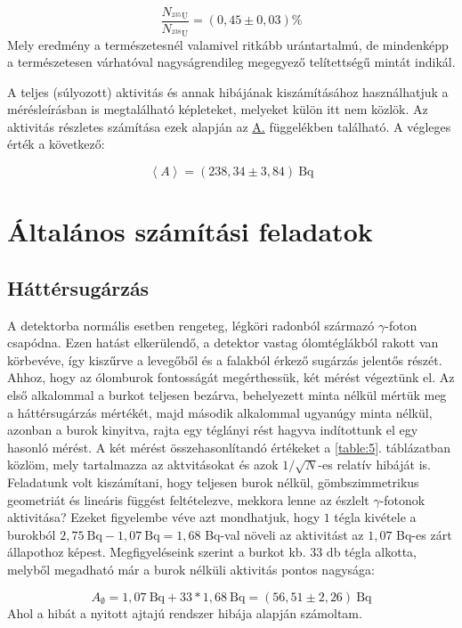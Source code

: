 \begin{multicols}{2}
\begin{equation}
\frac{N_{^{235}\text{U}}}{N_{^{238}\text{U}}}
=
\left( 0,45 \pm 0,03 \right) \%
\end{equation}
Mely eredmény a természetesnél valamivel ritkább urántartalmú, de mindenképp a természetesen várhatóval nagyságrendileg megegyező telítettségű mintát indikál. \par
A teljes (súlyozott) aktivitás és annak hibájának kiszámításához használhatjuk a mérésleírásban is megtalálható képleteket, melyeket külön itt nem közlök. Az aktivitás részletes számítása ezek alapján az \hyperref[appendix:A]{A.} függelékben található. A végleges érték a következő:

\begin{equation}
\left< A \right>
=
\left( 238,34 \pm 3,84 \right)\ \text{Bq} 
\end{equation}


\section{Általános számítási feladatok}
\subsection{Háttérsugárzás}
A detektorba normális esetben rengeteg, légköri radonból származó $\gamma$-foton csapódna. Ezen hatást elkerülendő, a detektor vastag ólomtéglákból rakott  van körbevéve, így kiszűrve a levegőből  és a falakból érkező sugárzás jelentős részét. Ahhoz, hogy az ólomburok fontosságát megérthessük, két mérést végeztünk el. Az első alkalommal a burkot teljesen bezárva, behelyezett minta nélkül mértük meg a háttérsugárzás mértékét, majd második alkalommal ugyanúgy minta nélkül, azonban a burok  kinyitva, rajta egy téglányi rést hagyva indítottunk el egy hasonló mérést. \newline
A két mérést összehasonlítandó értékeket a \ref{table:5}. táblázatban közlöm, mely tartalmazza az aktvitásokat és azok $1/\sqrt{N}$-es relatív hibáját is. Feladatunk volt kiszámítani, hogy teljesen burok nélkül, gömbszimmetrikus geometriát és lineáris függést feltételezve, mekkora lenne az észlelt $\gamma$-fotonok aktivitása? Ezeket figyelembe véve azt mondhatjuk, hogy $1$ tégla kivétele a burokból $2,75\ \text{Bq} - 1,07\ \text{Bq} = 1,68$ Bq-val növeli az aktivitást az $1,07$ Bq-es zárt állapothoz képest. Megfigyeléseink szerint a burkot kb. $33$ db tégla alkotta, melyből megadható már a burok nélküli aktivitás pontos nagysága:

\begin{equation}
A_{\emptyset}
=
1,07\ \text{Bq} + 33 * 1,68\ \text{Bq}
=
\left( 56,51 \pm 2,26 \right)\ \text{Bq}
\end{equation}
Ahol a hibát a nyitott ajtajú rendszer hibája alapján számoltam.

\end{multicols}